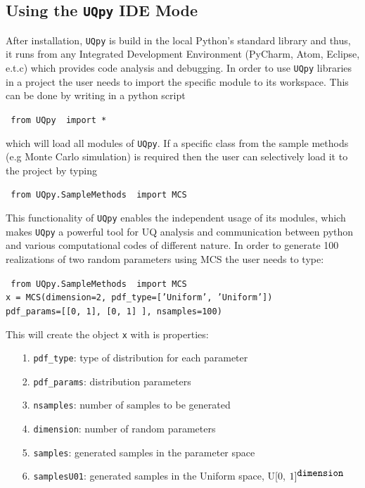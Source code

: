 \documentclass[preprint,12pt]{elsarticle}
\begin{document}
\subsection{Using the \texttt{UQpy}  IDE Mode}
\label{sec:IDE_Mode}

\noindent
After installation, \texttt{UQpy} is build in the local Python’s standard library and thus, it runs from any Integrated Development Environment (PyCharm, Atom, Eclipse, e.t.c) which provides code analysis and debugging. In order to use \texttt{UQpy} libraries in a project the user needs to import the specific module to its workspace. This can be done by writing in a python script

\vspace{4mm}
{\centering
 \texttt{{\color{blue} from} \texttt{UQpy} {\color{blue} import} * }\par}
\vspace{4mm}

\noindent
which will load all modules of \texttt{UQpy}. If a specific class from the sample methods  (e.g Monte Carlo simulation) is required then the user can selectively load it to the project by typing 
\vspace{4mm}

{\centering
 \texttt{{\color{blue} from} \texttt{UQpy.SampleMethods} {\color{blue} import} MCS }\par}

\vspace{4mm}
\noindent
This functionality of \texttt{UQpy} enables the independent usage of its  modules, which makes \texttt{UQpy} a powerful tool for UQ analysis and communication between python and various computational codes of different nature.  In order to generate 100 realizations of two random parameters using MCS  the user needs to type:
\vspace{4mm}

{\centering
	\texttt{{\color{blue} from} \texttt{UQpy.SampleMethods} {\color{blue} import} MCS }\\
	\texttt{x = MCS(dimension=2, pdf\_type=['Uniform', 'Uniform'])\\
	pdf\_params=[[0, 1], [0, 1] ], nsamples=100)}\par}

\vspace{4mm}
\noindent
This will create the object \texttt{x} with is properties:

\begin{itemize}
	\item[1.] \texttt{pdf\_type}: type of distribution for each parameter
	\item[2.] \texttt{pdf\_params}: distribution parameters
	\item[3.] \texttt{nsamples}: number of samples to be generated
	\item[4.] \texttt{dimension}: number of random parameters
	\item[5.] \texttt{samples}: generated samples in the parameter space
	\item[6.] \texttt{samplesU01}: generated samples in the Uniform space, U[0, $1]^{\mbox{\texttt{dimension}}}$
	\end{itemize}
\end{document}
